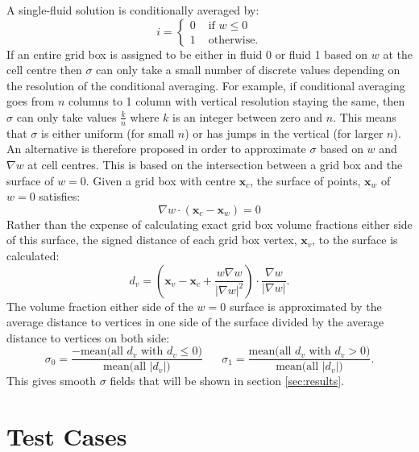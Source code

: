\documentclass[draft]{agujournal2019}
\begin{document}
A single-fluid solution is conditionally averaged by:
\begin{equation}
i =
\begin{cases}
    0 & \text{ if }w\le 0 \\
    1 & \text{ otherwise.}
\end{cases}
\end{equation}
If an entire grid box is assigned to be either in fluid 0 or fluid 1 based on $w$ at the cell centre then $\sigma$ can only take a small number of discrete values depending on the resolution of the conditional averaging. For example, if conditional averaging goes from $n$ columns to 1 column with vertical resolution staying the same, then $\sigma$ can only take values $\frac{k}{n}$ where $k$ is an integer between zero and $n$. This means that $\sigma$ is either uniform (for small $n$) or has jumps in the vertical (for larger $n$). An alternative is therefore proposed in order to approximate $\sigma$ based on $w$ and $\nabla w$ at cell centres. This is based on the intersection between a grid box and the surface of $w=0$. Given a grid box with centre $\mathbf{x}_c$, the surface of points, $\mathbf{x}_w$ of $w=0$ satisfies:
\begin{equation}
\nabla w \cdot \left(\mathbf{x}_c - \mathbf{x}_w\right) = 0
\end{equation}
Rather than the expense of calculating exact grid box volume fractions either side of this surface, the signed distance of each grid box vertex, $\mathbf{x}_v$, to the surface is calculated:
\begin{equation}
d_v = \left(
     \mathbf{x}_v - \mathbf{x}_c + \frac{w \nabla w}{|\nabla w|^2} 
\right) \cdot \frac{\nabla w}{|\nabla w|}.
\end{equation}
The volume fraction either side of the $w=0$ surface is approximated by the average distance to vertices in one side of the surface divided by the average distance to vertices on both side:
\begin{equation}
\sigma_0 = 
\frac{-\text{mean}\bigl(\text{all } d_v \text{ with } d_v \le 0\bigr)}
{\text{mean}\bigl(\text{all } |d_v| \bigl)}
\;\;\;\;\;\;
\sigma_1 = 
\frac{\text{mean}\bigl(\text{all } d_v \text{ with } d_v > 0\bigr)}
{\text{mean}\bigl(\text{all } |d_v| \bigl)}.
\end{equation}
This gives smooth $\sigma$ fields that will be shown in section \ref{sec:results}.

\section{\label{sec:results} Test Cases}
\end{document}
